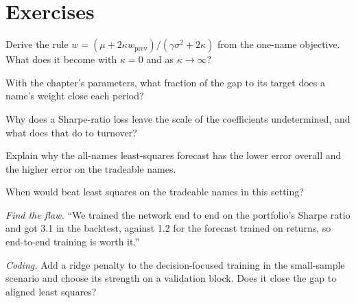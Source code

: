 \section{Exercises}

\begin{exercise}[$\star$]\label{exo:ml:from-prediction-to-portfolio:1}
Derive the rule $w = (\mu + 2\kappa w_{\mathrm{prev}})/(\gamma\sigma^2 + 2\kappa)$ from the one-name objective. What does it
become with $\kappa = 0$ and as $\kappa\to\infty$?
\end{exercise}

\begin{exercise}[$\star$]\label{exo:ml:from-prediction-to-portfolio:2}
With the chapter's parameters, what fraction of the gap to its target does a name's weight close each period?
\end{exercise}

\begin{exercise}[$\star$]\label{exo:ml:from-prediction-to-portfolio:3}
Why does a Sharpe-ratio loss leave the scale of the coefficients undetermined, and what does that do to turnover?
\end{exercise}

\begin{exercise}[$\star\star$]\label{exo:ml:from-prediction-to-portfolio:4}
Explain why the all-names least-squares forecast has the lower error overall and the higher error on the tradeable names.
\end{exercise}

\begin{exercise}[$\star\star$]\label{exo:ml:from-prediction-to-portfolio:5}
When would  beat least squares on the tradeable names in this setting?
\end{exercise}

\begin{exercise}[$\star\star$]\label{exo:ml:from-prediction-to-portfolio:6}
\emph{Find the flaw.} ``We trained the network end to end on the portfolio's Sharpe ratio and got 3.1 in the backtest, against
1.2 for the forecast trained on returns, so end-to-end training is worth it.''
\end{exercise}

\begin{exercise}[$\star\star\star$]\label{exo:ml:from-prediction-to-portfolio:7}
\emph{Coding.} Add a ridge penalty to the decision-focused training in the small-sample scenario and choose its strength on a
validation block. Does it close the gap to aligned least squares?
\end{exercise}

